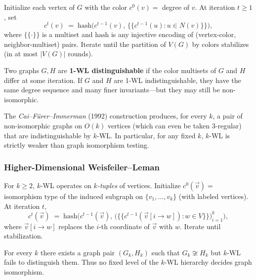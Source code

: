 \begin{definition}\label{def:cr}
Initialize each vertex of $G$ with the color $c^0(v) = $ degree of
$v$. At iteration $t \ge 1$, set
\[
  c^t(v) \;=\; \mathrm{hash}\big(c^{t-1}(v),\, \{\!\{c^{t-1}(u) : u \in N(v)\}\!\}\big),
\]
where $\{\!\{ \cdot \}\!\}$ is a multiset and $\mathrm{hash}$ is any
injective encoding of (vertex-color, neighbor-multiset) pairs.
Iterate until the partition of $V(G)$ by colors stabilizes (in at
most $|V(G)|$ rounds).
\end{definition}

\begin{theorem}[1-WL test]\label{thm:1wl}
Two graphs $G, H$ are \textbf{1-WL distinguishable} if the color
multisets of $G$ and $H$ differ at some iteration. If $G$ and $H$ are
1-WL indistinguishable, they have the same degree sequence and many
finer invariants---but they may still be non-isomorphic.
\end{theorem}

\begin{example}
The \emph{Cai--F\"urer--Immerman} (1992) construction produces, for
every $k$, a pair of non-isomorphic graphs on $O(k)$ vertices (which
can even be taken $3$-regular) that are indistinguishable by $k$-WL.
In particular, for any fixed $k$,
$k$-WL is strictly weaker than graph isomorphism testing.
\end{example}

\subsubsection{Higher-Dimensional Weisfeiler--Leman}

\begin{definition}[$k$-dimensional WL]\label{def:kwl}
For $k \ge 2$, $k$-WL operates on \emph{$k$-tuples} of vertices.
Initialize $c^0(\vec v) = $ isomorphism type of the induced subgraph
on $\{v_1, \ldots, v_k\}$ (with labeled vertices). At iteration $t$,
\[
  c^t(\vec v) \;=\; \mathrm{hash}\big(c^{t-1}(\vec v),\, \big(\{\!\{c^{t-1}(\vec v[i \to w]) : w \in V\}\!\}\big)_{i = 1}^{k}\big),
\]
where $\vec v[i \to w]$ replaces the $i$-th coordinate of $\vec v$
with $w$. Iterate until stabilization.
\end{definition}

\begin{theorem}\label{thm:cfi}
For every $k$ there exists a graph pair $(G_k, H_k)$ such that
$G_k \not\cong H_k$ but $k$-WL fails to distinguish them. Thus no
fixed level of the $k$-WL hierarchy decides graph isomorphism.
\end{theorem}

